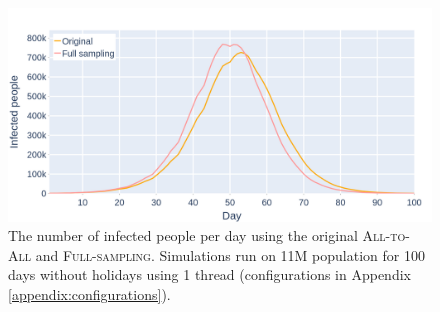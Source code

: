 \begin{figure}
    \centering
    \includegraphics[width=.8\linewidth]{4 - Sampling/fig/full_sampling/infections_full_sampling.png}
    \caption{The number of infected people per day using the original \textsc{All-to-All} and \textsc{Full-sampling}. Simulations run on 11M population for 100 days without holidays using 1 thread (configurations in Appendix \ref{appendix:configurations}).}
    \label{fig:infections_full_sampling}
\end{figure}


